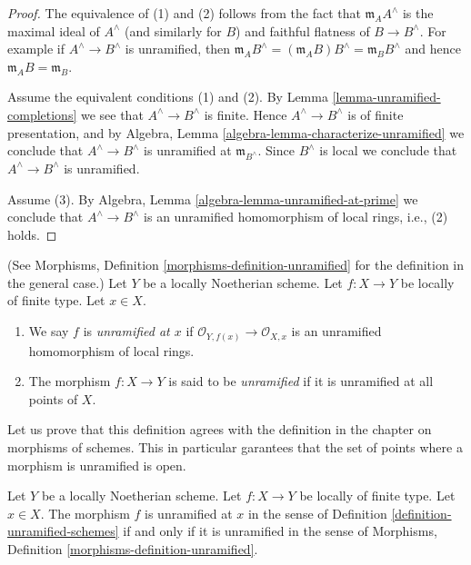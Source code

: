 \begin{proof}
The equivalence of (1) and (2) follows from the fact that
$\mathfrak m_AA^\wedge$ is the maximal ideal of $A^\wedge$
(and similarly for $B$) and faithful flatness of $B \to B^\wedge$.
For example if $A^\wedge \to B^\wedge$ is unramified, then
$\mathfrak m_AB^\wedge = (\mathfrak m_AB)B^\wedge = \mathfrak m_BB^\wedge$
and hence $\mathfrak m_AB = \mathfrak m_B$.

\medskip\noindent
Assume the equivalent conditions (1) and (2).
By Lemma \ref{lemma-unramified-completions}
we see that $A^\wedge \to B^\wedge$ is
finite. Hence $A^\wedge \to B^\wedge$ is of finite presentation, and by
Algebra, Lemma \ref{algebra-lemma-characterize-unramified}
we conclude that $A^\wedge \to B^\wedge$ is unramified at
$\mathfrak m_{B^\wedge}$. Since $B^\wedge$ is local we conclude
that $A^\wedge \to B^\wedge$ is unramified.

\medskip\noindent
Assume (3). By Algebra, Lemma \ref{algebra-lemma-unramified-at-prime}
we conclude that $A^\wedge \to B^\wedge$ is an unramified homomorphism
of local rings, i.e., (2) holds.
\end{proof}

\begin{definition}
\label{definition-unramified-schemes}
(See Morphisms, Definition \ref{morphisms-definition-unramified}
for the definition in the general case.)
Let $Y$ be a locally Noetherian scheme.
Let $f : X \to Y$ be locally of finite type.
Let $x \in X$.
\begin{enumerate}
\item We say $f$ is {\it unramified at $x$} if
$\mathcal{O}_{Y, f(x)} \to \mathcal{O}_{X, x}$
is an unramified homomorphism of local rings.
\item The morphism $f : X \to Y$ is said to be {\it unramified}
if it is unramified at all points of $X$.
\end{enumerate}
\end{definition}

\noindent
Let us prove that this definition agrees with the definition in the
chapter on morphisms of schemes. This in particular garantees that the
set of points where a morphism is unramified is open.

\begin{lemma}
\label{lemma-unramified-defintion}
Let $Y$ be a locally Noetherian scheme.
Let $f : X \to Y$ be locally of finite type.
Let $x \in X$. The morphism $f$ is unramified at $x$ in
the sense of Definition \ref{definition-unramified-schemes}
if and only if it is unramified in
the sense of Morphisms, Definition \ref{morphisms-definition-unramified}.
\end{lemma}

